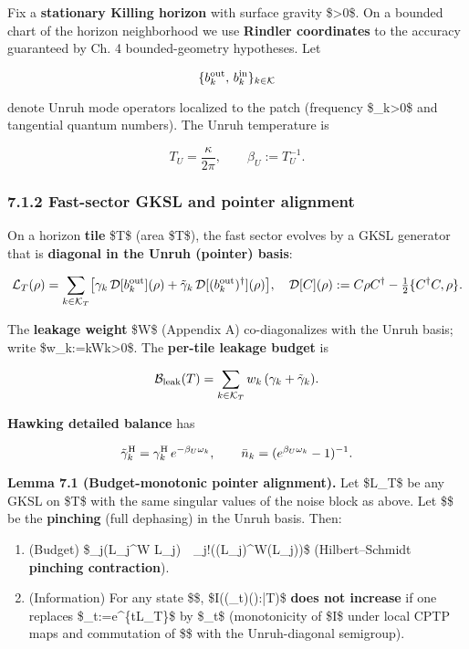 \documentclass[
]{article}
\providecommand{\tightlist}{%
  \setlength{\itemsep}{0pt}\setlength{\parskip}{0pt}}
\numberwithin{equation}{section}
\begin{document}
Fix a \textbf{stationary Killing horizon} with surface gravity
\$\kappa\textgreater0\$. On a bounded chart of the horizon neighborhood
we use \textbf{Rindler coordinates} to the accuracy guaranteed by Ch. 4
bounded-geometry hypotheses. Let

\[
\{b_k^{\rm out},\,b_k^{\rm in}\}_{k\in\mathcal K}
\]

denote Unruh mode operators localized to the patch (frequency
\$\omega\_k\textgreater0\$ and tangential quantum numbers). The Unruh
temperature is

\[
T_U=\frac{\kappa}{2\pi},\qquad \beta_U:=T_U^{-1}.
\]

\hypertarget{fast-sector-gksl-and-pointer-alignment}{%
\subsubsection{7.1.2 Fast-sector GKSL and pointer
alignment}\label{fast-sector-gksl-and-pointer-alignment}}

On a horizon \textbf{tile} \$T\$ (area \$\textbar T\textbar\$), the fast
sector evolves by a GKSL generator that is \textbf{diagonal in the Unruh
(pointer) basis}:

\[
\mathcal L_T(\rho)=\sum_{k\in\mathcal K_T}\!\big[\gamma_k\,\mathcal D[b_k^{\rm out}](\rho)+\tilde\gamma_k\,\mathcal D[(b_k^{\rm out})^\dagger](\rho)\big],\quad
\mathcal D[C](\rho):=C\rho C^\dagger-\tfrac12\{C^\dagger C,\rho\}.
\]

The \textbf{leakage weight} \$W\$ (Appendix A) co-diagonalizes
with the Unruh basis; write
\$w\_k:=\langle k\textbar W\textbar k\rangle\textgreater0\$. The
\textbf{per-tile leakage budget} is

\[
\mathcal B_{\rm leak}(T)=\sum_{k\in\mathcal K_T} w_k\,(\gamma_k+\tilde\gamma_k).
\]

\textbf{Hawking detailed balance} has

\[
\tilde\gamma_k^{\rm H}=\gamma_k^{\rm H}\,e^{-\beta_U\omega_k},\qquad \bar n_k=(e^{\beta_U\omega_k}-1)^{-1}.
\]

\textbf{Lemma 7.1 (Budget-monotonic pointer alignment).} Let
\$\mathcal L\_T\$ be any GKSL on \$T\$ with the same singular values of
the noise block as above. Let \$\Delta\$ be the \textbf{pinching} (full
dephasing) in the Unruh basis. Then:

\begin{enumerate}
\def\labelenumi{\arabic{enumi}.}
\tightlist
\item
  (Budget) \$\sum\_j\omega(L\_j\^{}\dagger W
  L\_j)~\ge~\sum\_j\omega!\big((\Delta L\_j)\^{}\dagger W(\Delta L\_j)\big)\$
  (Hilbert--Schmidt \textbf{pinching contraction}).
\item
  (Information) For any state \$\rho\$,
  \$I\big((\otimes\Lambda\_t)(\rho):\bar T\big)\$
  \textbf{does not increase} if one replaces
  \$\Lambda\_t:=e\^{}\{t\mathcal L\_T\}\$ by
  \$\Delta\circ\Lambda\_t\circ\Delta\$ (monotonicity of \$I\$ under
  local CPTP maps and commutation of \$\Delta\$ with the Unruh-diagonal
  semigroup).
\end{enumerate}
\end{document}
